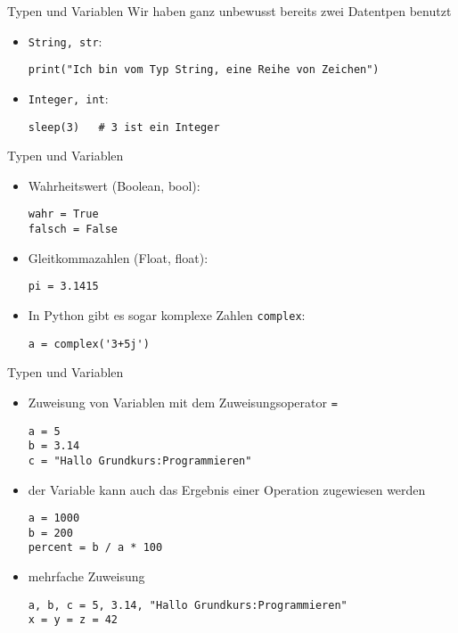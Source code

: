 \begin{frame}[fragile]{Typen und Variablen}
Wir haben ganz unbewusst bereits zwei Datentpen benutzt
\begin{itemize}
    \item \texttt{String, str}: 
    \begin{lstlisting}
print("Ich bin vom Typ String, eine Reihe von Zeichen")
    \end{lstlisting}
    \item \texttt{Integer, int}: 
    \begin{lstlisting}
sleep(3)   # 3 ist ein Integer
    \end{lstlisting}
\end{itemize}
\end{frame}

\begin{frame}[fragile]{Typen und Variablen}
\begin{itemize}
    \item Wahrheitswert (Boolean, bool): 
    \begin{lstlisting}
wahr = True
falsch = False
    \end{lstlisting}
    \item Gleitkommazahlen (Float, float):
    \begin{lstlisting}
pi = 3.1415
    \end{lstlisting}
    \item In Python gibt es sogar komplexe Zahlen \texttt{complex}:
    \begin{lstlisting}
a = complex('3+5j')
    \end{lstlisting}

\end{itemize}
\end{frame}

\begin{frame}[fragile]{Typen und Variablen}
\begin{itemize}
    \item Zuweisung von Variablen mit dem Zuweisungsoperator \texttt{=}
    \begin{lstlisting}
a = 5
b = 3.14
c = "Hallo Grundkurs:Programmieren"
    \end{lstlisting}
    \item der Variable kann auch das Ergebnis einer Operation zugewiesen werden
    \begin{lstlisting}
a = 1000
b = 200
percent = b / a * 100
    \end{lstlisting}
    \item mehrfache Zuweisung 
    \begin{lstlisting}
a, b, c = 5, 3.14, "Hallo Grundkurs:Programmieren"
x = y = z = 42
    \end{lstlisting}
\end{itemize}
\end{frame}


